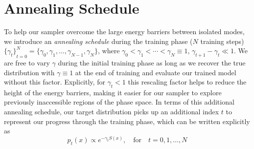 \documentclass{article} %
\begin{document}
\section{\label{sec:annealing}Annealing Schedule}
%
To help our sampler overcome the large energy barriers between isolated modes, we introduce an \emph{annealing schedule}
during the training phase (\(N\) training steps) \({\{\gamma_{t}\}}_{t=0}^{N} = \{\gamma_{0}, \gamma_{1}, \ldots,
\gamma_{N-1}, \gamma_{N}\}\), where \(\gamma_{0} < \gamma_{1} < \cdots < \gamma_{N} \equiv 1\), \(\gamma_{t+1} -
\gamma_{t} \ll 1\).
%
We are free to vary \(\gamma\) during the initial training phase as long as we recover the true distribution
with \(\gamma \equiv 1\) at the end of training and evaluate our trained model without this factor.
%
Explicitly, for \(\gamma_{t} < 1\) this rescaling factor helps to reduce the height of the energy barriers, making it
easier for our sampler to explore previously inaccessible regions of the phase space.
%
In terms of this additional annealing schedule, our target distribution picks up an additional index \(t\) to represent
our progress through the training phase, which can be written explicitly as 
%
\begin{equation}
   p_{t}(x)\propto e^{-\gamma_{t} S(x)},\quad\text{for}\quad t=0, 1, \ldots, N
   \label{eq:targetannealing}
\end{equation}
%
\end{document}
